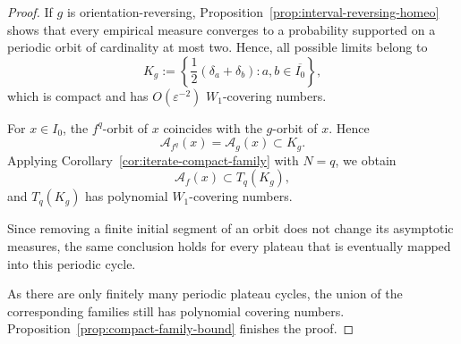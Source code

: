 \documentclass[12pt,a4paper,twoside]{article}
\theoremstyle{plain}
\theoremstyle{definition}
\newcommand{\cA}{{\mathcal A}}
\begin{document}
\begin{proof}
If $g$ is orientation-reversing, Proposition~\ref{prop:interval-reversing-homeo} shows that every empirical measure converges to a probability supported on a periodic orbit of cardinality at most two. Hence, all possible limits belong to
\[
K_g:=
\left\{
\frac12(\delta_a+\delta_b):
a,b\in\overline{I_0}
\right\},
\]
which is compact and has $O(\varepsilon^{-2})$ $W_1$-covering numbers.

For \(x\in I_0\), the \(f^q\)-orbit of \(x\) coincides with the
\(g\)-orbit of \(x\). Hence
\[
\cA_{f^q}(x)=\cA_g(x)\subset K_g.
\]
Applying Corollary~\ref{cor:iterate-compact-family} with \(N=q\), we obtain
\[
\cA_f(x)\subset T_q(K_g),
\]
and \(T_q(K_g)\) has polynomial \(W_1\)-covering numbers.

Since removing a finite initial segment of an orbit does not change its
asymptotic measures, the same conclusion holds for every plateau that is
eventually mapped into this periodic cycle.

As there are only finitely many periodic plateau cycles, the union of the corresponding families still has polynomial covering numbers.
Proposition~\ref{prop:compact-family-bound} finishes the proof.
	\end{proof}
	
\end{document}
